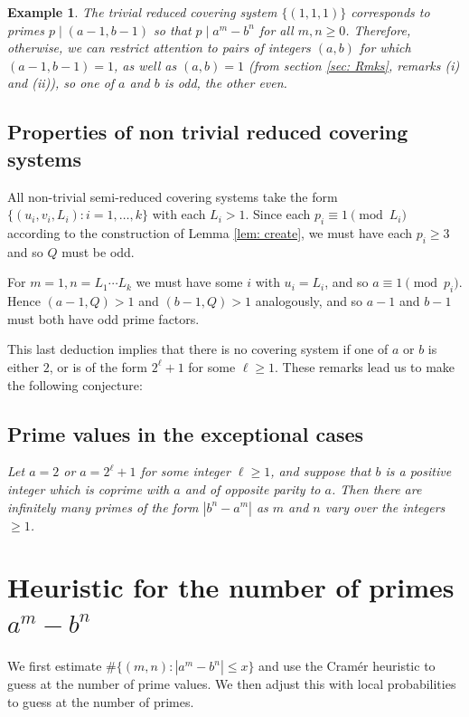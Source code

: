 \documentclass[12pt, a4paper,  reqno, english]{amsart}%
\numberwithin{equation}{section}
\newtheorem{example}{Example}
\theoremstyle{definition}
\renewcommand{\leq}{\leqslant}
\renewcommand{\geq}{\geqslant}
\begin{document}
\begin{example} The \emph{trivial} reduced covering system $\{(1,1,1)\}$
corresponds to primes $p\mid (a-1,b-1)$ so that $p\mid a^m-b^n$ for all $m,n\ge0$.
Therefore, otherwise, we can restrict attention to pairs of integers $(a,b)$ for which  $(a-1,b-1)=1$, as well as $(a,b)=1$ (from section \ref{sec: Rmks}, remarks (i) and (ii)), so  one of $a$ and $b$ is odd, the other even.
\end{example}

\subsection{Properties of non trivial reduced covering systems}
All non-trivial semi-reduced covering systems take the form  $\{ (u_i,v_i,L_i): i=1,\dots,k\}$ with each $L_i>1$.
Since each $p_i\equiv 1 \pmod {L_i}$ according to the construction of Lemma \ref{lem: create}, we must have each $p_i\geq 3$ and so  $Q$ must be odd.

For $m=1,n=L_1\cdots L_k$ we must have some $i$ with $u_i=L_i$, and so $a\equiv 1 \pmod {p_i}$. Hence
$(a-1,Q)>1$   and $(b-1,Q)>1$ analogously, and so $a-1$ and $b-1$ must both have odd prime factors.

This last deduction implies that there is no covering system if one of $a$ or $b$ is either $2$, or is of the form $2^\ell+1$ for some $\ell\geq 1$. These   remarks lead us to make the following conjecture:


 
 



 
\subsection*{Prime values in the exceptional cases}
 \emph{Let $a=2$ or $a=2^\ell+1$ for some integer $\ell\geq 1$, and suppose that
 $b$ is a positive integer which is coprime with $a$ and of opposite parity to $a$. Then  there are infinitely many primes of the form $|b^n-a^m|$ as $m$ and $n$ vary over the  integers $\geq 1$.}
 

    
 
\section{Heuristic for the number of primes $a^m-b^n$}

We first estimate $\#\{ (m,n): |a^m-b^n|\leq x\}$ and use the Cram\'er heuristic to guess at the number of prime values. We then
adjust this with local probabilities to guess at the number of primes.
\end{document}

